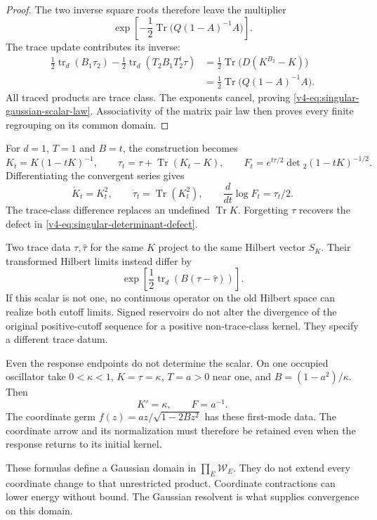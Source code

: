 \begin{proof}
The two inverse square roots therefore
leave the multiplier
\[
                \exp\left[-\frac12
                     \operatorname{Tr}\bigl(Q(1-A)^{-1}A\bigr)\right].
\]
The trace update contributes its inverse:
\[
 \begin{aligned}
 \frac12\operatorname{tr}_d(B_1\tau_2)
   -\frac12\operatorname{tr}_d(T_2B_1T_2^t\tau)
     &=\frac12\operatorname{Tr}\bigl(D(K^{B_2}-K)\bigr)\\
     &=\frac12\operatorname{Tr}\bigl(Q(1-A)^{-1}A\bigr).
 \end{aligned}
\]
All traced products are trace class.
The exponents cancel, proving
\eqref{v4-eq:singular-gaussian-scalar-law}.
Associativity of the matrix pair law
then proves every finite regrouping on
its common domain.
\end{proof}

For \(d=1\), \(T=1\) and \(B=t\),
the construction becomes
\[
 K_t=K(1-tK)^{-1},\qquad
 \tau_t=\tau+\operatorname{Tr}(K_t-K),\qquad
 F_t=e^{t\tau/2}\det{}_2(1-tK)^{-1/2}.
\]
Differentiating the convergent series gives
\[
       \dot K_t=K_t^2,\qquad
       \dot\tau_t=\operatorname{Tr}(K_t^2),\qquad
       \frac{d}{dt}\log F_t=\tau_t/2.
\]
The trace-class difference replaces an
undefined \(\operatorname{Tr}K\).
Forgetting \(\tau\) recovers the defect
in \eqref{v4-eq:singular-determinant-defect}.

Two trace data \(\tau,\widehat\tau\) for
the same \(K\) project to the same
Hilbert vector \(S_K\).
Their transformed Hilbert limits instead
differ by
\[
               \exp\left[\frac12
                     \operatorname{tr}_d(B(\tau-\widehat\tau))\right].
\]
If this scalar is not one, no continuous
operator on the old Hilbert space can
realize both cutoff limits.
Signed reservoirs do not alter the divergence
of the original positive-cutoff sequence
for a positive non-trace-class kernel.
They specify a different trace datum.

Even the response endpoints do not
determine the scalar. On one occupied
oscillator take \(0<\kappa<1\),
\(K=\tau=\kappa\), \(T=a>0\) near one,
and \(B=(1-a^2)/\kappa\). Then
\[
                      K'=\kappa,\qquad F=a^{-1}.
\]
The coordinate germ
\(f(z)=az/\sqrt{1-2Bz^2}\) has these
first-mode data. The coordinate arrow
and its normalization must therefore
be retained even when the response returns
to its initial kernel.

These formulas define a Gaussian domain
in \(\prod_E\mathcal W_E\).
They do not extend every coordinate change
to that unrestricted product.
Coordinate contractions can lower energy
without bound. The Gaussian resolvent is
what supplies convergence on this domain.

